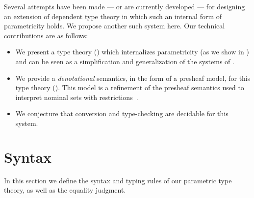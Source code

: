 \documentclass[english]{PaperTools/latex/lipics}
\begin{document}
Several attempts have been made
\citep{bernardy_computational_2012,bernardy_type-theory_2013} --- or are currently
developed \citep{altenkirch2014syntax} ---
for designing an extension of dependent type theory in which such an internal form of
parametricity holds. We propose another such system here.
Our technical contributions are as follows:
\begin{itemize}
\item We present a type theory () which internalizes parametricity (as we show in )
  and can be seen as a simplification and generalization of the systems of
  \cite{bernardy_computational_2012,bernardy_type-theory_2013}.
\item We provide a \emph{denotational} semantics, in the form of a presheaf model, for this type theory ().
      This model is a refinement of the presheaf semantics used to
      interpret nominal sets with
      restrictions~\citep{bezem2014model,DBLP:journals/corr/Pitts14}.
\item We conjecture that conversion and type-checking are decidable for this system.
\end{itemize}

\section{Syntax}
\label{sec:syntax}
In this section we define the syntax and typing rules of our
parametric type theory, as well as the equality judgment.
\end{document}
